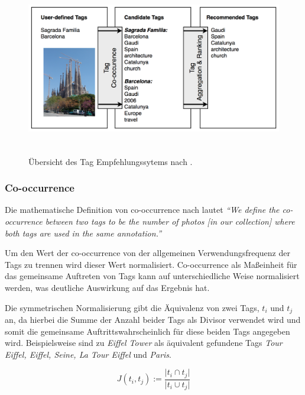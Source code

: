 \begin{figure}[htbp]
  \centering
    \includegraphics[height=3in]{images/collective_knowledge_system_overview.png}
  \caption{Übersicht des Tag Empfehlungssytems nach \cite{collectiveKnowledge}.}
  \label{fig:images_collective_knowledge_system_overview}
\end{figure}





\subsubsection{Co-occurrence} %
\label{ssub:co_occurrence}

Die mathematische Definition von co-occurrence nach \cite{collectiveKnowledge} lautet \emph{``We define the co-occurrence between two tags to be the number of photos [in our collection] where both tags are used in the same annotation.''} 
 
 
Um den Wert der co-occurrence von der allgemeinen Verwendungsfrequenz der Tags zu trennen wird dieser Wert normalisiert. Co-occurrence als Maßeinheit für das gemeinsame Auftreten von Tags kann auf unterschiedliche Weise normalisiert werden, was deutliche Auswirkung auf das Ergebnis hat.

Die symmetrischen Normalisierung gibt die Äquivalenz von zwei Tags, ${t_i}$ und ${t_j}$ an, da hierbei die Summe der Anzahl beider Tags als Divisor verwendet wird und somit die gemeinsame Auftrittswahrscheinlich für diese beiden Tags angegeben wird. Beispielsweise sind zu \emph{Eiffel Tower} als äquivalent gefundene Tags \emph{Tour Eiffel, Eiffel, Seine, La Tour Eiffel} und \emph{Paris}.
\begin{figure}[hptb]
  \begin{equation}
  \label{symmetricNormalization}
   J(t_i, t_j) := \frac{\vert t_i \cap t_j \vert}{ \vert t_i \cup t_j \vert }
  \end{equation}
\end{figure}

